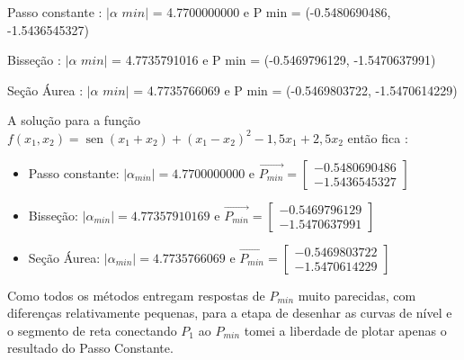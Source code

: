 \documentclass[10pt, a4paper]{article}
\DeclareMathOperator{\sen}{sen}
\begin{document}
Passo constante : $|\alpha \,\, min|$ = 4.7700000000 e P min = (-0.5480690486, -1.5436545327)

Bisseção        : $|\alpha \,\, min|$ = 4.7735791016 e P min = (-0.5469796129, -1.5470637991)

Seção Áurea     : $|\alpha \,\,  min|$ = 4.7735766069 e P min = (-0.5469803722, -1.5470614229)\newline

A solução para a função $f(x_1, x_2) = \sen{(x_1 + x_2)} + (x_1 - x_2)^2 - 1,5x_1 + 2,5x_2$ então fica :
\newline

\begin{itemize}
  \item Passo constante: $|\alpha_{min}| = 4.7700000000$ e $\overrightarrow{P_{min}} =  
  \begin{bmatrix}
    -0.5480690486 \\ -1.5436545327
  \end{bmatrix}$
  \item Bisseção: $|\alpha_{min}| = 4.77357910169$ e $\overrightarrow{P_{min}} =  
  \begin{bmatrix}
    -0.5469796129 \\ -1.5470637991
  \end{bmatrix}$
  \item Seção Áurea: $|\alpha_{min}| = 4.7735766069$ e $\overrightarrow{P_{min}} =  
  \begin{bmatrix}
    -0.5469803722 \\ -1.5470614229
  \end{bmatrix}$
\end{itemize}

Como todos os métodos entregam respostas de $P_{min}$ muito parecidas, com diferenças relativamente pequenas,
para a etapa de desenhar as curvas de nível e o segmento de reta conectando $P_1$ ao $P_{min}$ tomei a liberdade
de plotar apenas o resultado do Passo Constante.
\end{document}
